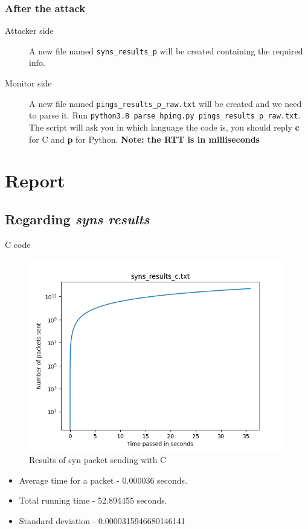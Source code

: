 \documentclass[11pt]{article}
\begin{document}
\subsubsection{After the attack}
\label{sec:org18c2761}
\begin{description}
\item[{Attacker side}] A new file named \texttt{syns\_results\_p} will be created containing the required info.
\item[{Monitor side}] A new file named \texttt{pings\_results\_p\_raw.txt} will be created and we need to parse it. Run \texttt{python3.8 parse\_hping.py pings\_results\_p\_raw.txt}.
The script will ask you in which language the code is, you should reply \textbf{c} for C and \textbf{p} for Python. \textbf{Note: the RTT is in milliseconds}
\end{description}
\section{Report}
\label{sec:orgd96f47b}
\subsection{Regarding \emph{syns results}}
\label{sec:org78d6638}
\begin{description}
\item[{C code}] 
\end{description}
\begin{figure}[htbp]
\centering
\includegraphics[width=.9\linewidth]{results/Syn_pkts_c.png}
\caption{Results of syn packet sending with C}
\end{figure}
\begin{itemize}
\item Average time for a packet - 0.000036 seconds.
\item Total running time - 52.894455 seconds.
\item Standard deviation - 0.0000315946680146141
\end{itemize}
\end{document}
